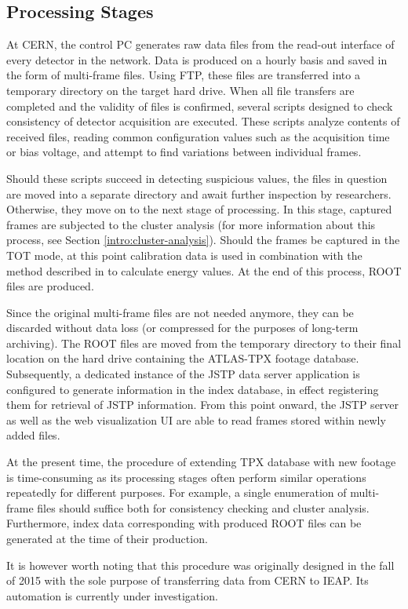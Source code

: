 \subsection{Processing Stages}
At CERN, the control PC generates raw data files from the read-out interface of every detector in the network. Data is produced on a hourly basis and saved in the form of multi-frame files. Using FTP, these files are transferred into a temporary directory on the target hard drive. When all file transfers are completed and the validity of files is confirmed, several scripts designed to check consistency of detector acquisition are executed. These scripts analyze contents of received files, reading common configuration values such as the acquisition time or bias voltage, and attempt to find variations between individual frames.

Should these scripts succeed in detecting suspicious values, the files in question are moved into a separate directory and await further inspection by researchers. Otherwise, they move on to the next stage of processing. In this stage, captured frames are subjected to the cluster analysis (for more information about this process, see Section \ref{intro:cluster-analysis}). Should the frames be captured in the TOT mode, at this point calibration data is used in combination with the method described in \cite{EnergyCalibration} to calculate energy values. At the end of this process, ROOT files are produced.

Since the original multi-frame files are not needed anymore, they can be discarded without data loss (or compressed for the purposes of long-term archiving). The ROOT files are moved from the temporary directory to their final location on the hard drive containing the ATLAS-TPX footage database. Subsequently, a dedicated instance of the JSTP data server application is configured to generate information in the index database, in effect registering them for retrieval of JSTP information. From this point onward, the JSTP server as well as the web visualization UI are able to read frames stored within newly added files.

\label{import-automation}
At the present time, the procedure of extending TPX database with new footage is time-consuming as its processing stages often perform similar operations repeatedly for different purposes. For example, a single enumeration of multi-frame files should suffice both for consistency checking and cluster analysis. Furthermore, index data corresponding with produced ROOT files can be generated at the time of their production.

It is however worth noting that this procedure was originally designed in the fall of 2015 with the sole purpose of transferring data from CERN to IEAP. Its automation is currently under investigation.
